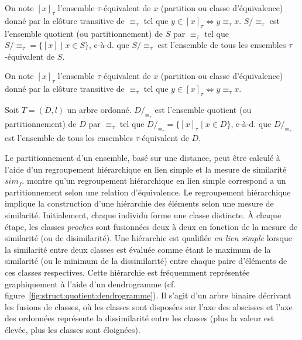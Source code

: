 \begin{definition}
    On note $[x]_\tau$ l'ensemble $\tau$-équivalent de $x$ (partition ou classe d'équivalence) donné par la clôture transitive de $\equiv_\tau$ tel que $y \in [x]_\tau \iff y \equiv_\tau x$.
    $S/\equiv_\tau$ est l'ensemble quotient (ou partitionnement) de $S$ par $\equiv_\tau$ tel que $S/\equiv_\tau = \{[x] \mid x \in S\}$, c-à-d. que $S/\equiv_\tau$ est l'ensemble de tous les ensembles $\tau$-équivalent de $S$.
\end{definition}

\begin{definition}
    On note $[x]_\tau$ l'ensemble $\tau$-équivalent de $x$ (partition ou classe d'équivalence) donné par la clôture transitive de $\equiv_\tau$ tel que $y \in [x]_\tau \iff y \equiv_\tau x$.

    Soit $T = (D, l)$ un arbre ordonné.
    $D/_{\equiv_\tau}$ est l'ensemble quotient (ou partitionnement) de $D$ par $\equiv_\tau$ tel que $D/_{\equiv_\tau} = \{[x]_\tau \mid x \in D\}$, c-à-d. que $D/_{\equiv_\tau}$ est l'ensemble de tous les ensembles $\tau$-équivalent de $D$.
\end{definition}

Le partitionnement d'un ensemble, basé sur une distance, peut être calculé à l'aide d'un regroupement hiérarchique en lien simple et la mesure de similarité $sim_f$.
\cite{carlssonCharacterizationStabilityConvergence2010} montre qu'un regroupement hiérarchique en lien simple correspond a un partitionnement selon une relation d'équivalence.
Le regroupement hiérarchique implique la construction d'une hiérarchie des éléments selon une mesure de similarité.
Initialement, chaque individu forme une classe distincte.
À chaque étape, les classes \emph{proches} sont fusionnées deux à deux en fonction de la mesure de similarité (ou de disimilarité).
Une hiérarchie est qualifiée \emph{en lien simple} lorsque la similarité entre deux classes est évaluée comme étant le maximum de la similarité (ou le minimum de la dissimilarité) entre chaque paire d'éléments de ces classes respectives.
Cette hiérarchie est fréquemment représentée graphiquement à l'aide d'un dendrogramme (cf. figure~\ref{fig:struct:quotient:dendrogramme}).
Il s'agit d'un arbre binaire décrivant les fusions de classes, où les classes sont disposées sur l'axe des abscisses et l'axe des ordonnées représente la dissimilarité entre les classes (plus la valeur est élevée, plus les classes sont éloignées).

